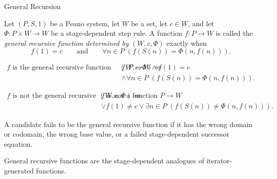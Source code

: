\begin{topicbox}{General Recursion}
\begin{tcolorbox}[colback=defbox, colframe=defborder, arc=2pt,
  left=6pt, right=6pt, top=4pt, bottom=4pt,
  title={\small\textbf{Definition (General Recursive Function)}},
  fonttitle=\small\bfseries]
\begin{definition}
\label{def:general-recursive-function}
Let $(P,S,1)$ be a Peano system, let $W$ be a set, let $c\in W$, and let
$\Phi:P\times W\to W$ be a stage-dependent step rule. A function $f:P\to W$
is called the \emph{general recursive function determined by $(W,c,\Phi)$}
exactly when
\[
f(1)=c
\qquad\text{and}\qquad
\forall n\in P\;(f(S(n))=\Phi(n,f(n))).
\]
\end{definition}
\end{tcolorbox}

\begin{remark*}
\[
\begin{aligned}
f \text{ is the general recursive function determined by } (W,c,\Phi)
\Longleftrightarrow\;&
f:P\to W\land f(1)=c\\
&\land \forall n\in P\;(f(S(n))=\Phi(n,f(n))).
\end{aligned}
\]
\end{remark*}


\begin{remark*}
\[
\begin{aligned}
f \text{ is not the general recursive function determined by } (W,c,\Phi)
\Longleftrightarrow\;&
f \text{ is not a function } P\to W\\
&\lor f(1)\neq c
\lor \exists n\in P\;(f(S(n))\neq \Phi(n,f(n))).
\end{aligned}
\]
\end{remark*}

\begin{remark*}
A candidate fails to be the general recursive function if it has the wrong
domain or codomain, the wrong base value, or a failed stage-dependent
successor equation.
\end{remark*}

\begin{remark*}[Interpretation]
General recursive functions are the stage-dependent analogues of
iterator-generated functions.
\end{remark*}


\end{topicbox}
